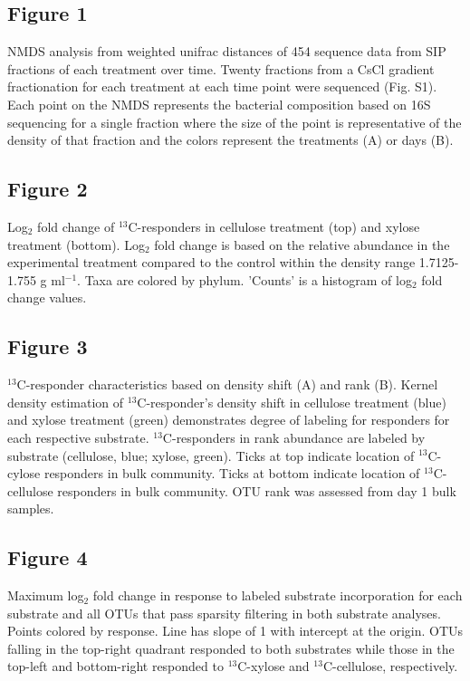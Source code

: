 \subsection{Figure 1}
NMDS analysis from weighted unifrac distances of 454 sequence data from SIP fractions of each treatment over time. Twenty fractions from a CsCl gradient fractionation for each treatment at each time point were sequenced (Fig. S1). Each point on the NMDS represents the bacterial composition based on 16S sequencing for a single fraction where the size of the point is representative of the density of that fraction and the colors represent the treatments (A) or days (B). 
\subsection{Figure 2}
Log$_{2}$ fold change of $^{13}$C-responders in cellulose
treatment (top) and xylose treatment (bottom).  Log$_{2}$ fold change is based
on the relative abundance in the experimental treatment compared to the control
within the density range 1.7125-1.755 g ml$^{-1}$. Taxa are
colored by phylum. 'Counts' is a histogram of log$_{2}$ fold change values.    
\subsection{Figure 3}
$^{13}$C-responder characteristics based on density shift (A) and rank (B).
Kernel density estimation of $^{13}$C-responder's density shift in cellulose
treatment (blue) and xylose treatment (green) demonstrates degree of labeling
for responders for each respective substrate. $^{13}$C-responders in rank
abundance are labeled by substrate (cellulose, blue; xylose, green). Ticks at top indicate
location of $^{13}$C-cylose responders in bulk community. Ticks at bottom indicate location of
$^{13}$C-cellulose responders in bulk community. OTU rank was assessed from day 1 bulk samples.\subsection{Figure 4}
Maximum log$_{2}$ fold change in response to labeled substrate incorporation for each substrate and all OTUs that pass sparsity filtering in both substrate analyses. Points colored by response. Line has slope of 1 with intercept at the origin. OTUs falling in the top-right quadrant responded to both substrates while those in the top-left and bottom-right responded to $^{13}$C-xylose and $^{13}$C-cellulose, respectively.